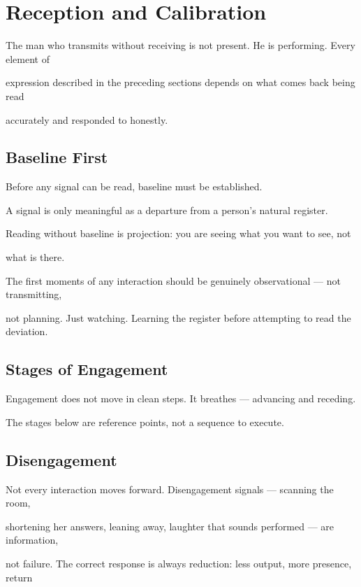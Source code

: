 \documentclass[12pt, a4paper]{article}
\begin{document}
\section{Reception and Calibration}

The man who transmits without receiving is not present. He is performing. Every element of

expression described in the preceding sections depends on what comes back being read

accurately and responded to honestly.

\subsection{Baseline First}\label{subsec:baseline}

Before any signal can be read, baseline must be established.

A signal is only meaningful as a departure from a person's natural register.

Reading without baseline is projection: you are seeing what you want to see, not

what is there.

The first moments of any interaction should be genuinely observational --- not transmitting,

not planning. Just watching. Learning the register before attempting to read the deviation.

\subsection{Stages of Engagement}

Engagement does not move in clean steps. It breathes --- advancing and receding.

The stages below are reference points, not a sequence to execute.



\subsection{Disengagement}

Not every interaction moves forward. Disengagement signals --- scanning the room,

shortening her answers, leaning away, laughter that sounds performed --- are information,

not failure. The correct response is always reduction: less output, more presence, return
\end{document}
